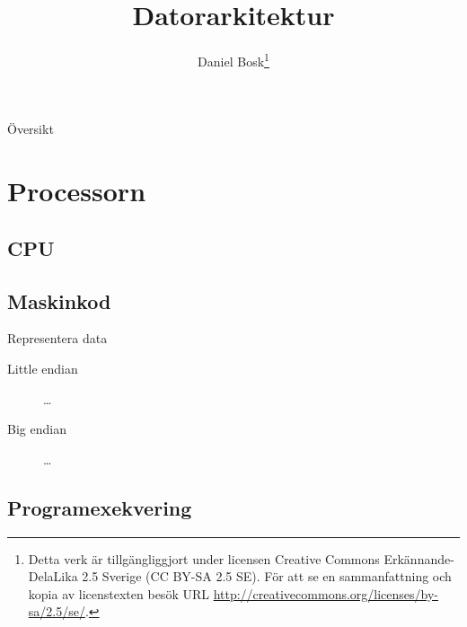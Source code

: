 \documentclass{beamer}
\title{%
  Datorarkitektur
}
\author{Daniel Bosk\footnote{%
  \tiny
  Detta verk är tillgängliggjort under licensen Creative Commons 
  Erkännande-DelaLika 2.5 Sverige (CC BY-SA 2.5 SE).
  För att se en sammanfattning och kopia av licenstexten besök URL 
  \url{http://creativecommons.org/licenses/by-sa/2.5/se/}.
}}
\institute[MIUN ITM]{%
  Avdelningen för informations- och kommunikationssytem (IKS),\\
  Mittuniversitetet, Sundsvall.
}
\date{\svnId}
\theoremstyle{definition}
\theoremstyle{remark}
\begin{document}
\begin{frame}
  \titlepage
\end{frame}

\begin{frame}{Översikt}
  \tableofcontents
\end{frame}

\begin{frame}
  
\end{frame}





\section{Processorn}

\subsection{CPU}

\begin{frame}{\insertsubsectionhead}
\end{frame}

\subsection{Maskinkod}

\begin{frame}{\insertsubsectionhead}
\end{frame}

\begin{frame}{\insertsubsectionhead}{Representera data}
  \begin{description}
    \item[Little endian] \dots
    \item[Big endian] \dots
  \end{description}
\end{frame}

\subsection{Programexekvering}
\end{document}
